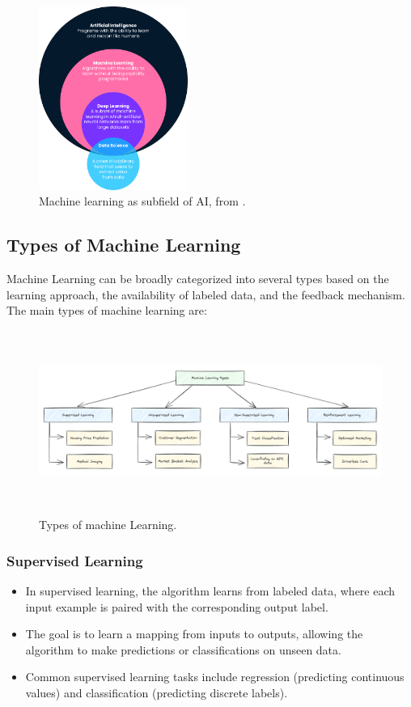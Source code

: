 \begin{figure}[htpb]
    \centering
    \includegraphics[width=\textwidth,height=6cm,keepaspectratio=true]{ml.png}
    \caption{
        Machine learning as subfield of AI, from \cite{datacamp:ml}.
    }
\end{figure}

\subsection{Types of Machine Learning}

Machine Learning can be broadly categorized into several types based on the learning approach, the availability of labeled data, and the feedback mechanism. The main types of machine learning are:

\begin{figure}[htpb]
    \centering
    \includegraphics[width=\textwidth,height=6cm,keepaspectratio=true]{ml-types.png}
    \caption{
        Types of machine Learning.
    }
\end{figure}

\subsubsection*{Supervised Learning}

\begin{itemize}
    \item{In supervised learning, the algorithm learns from labeled data, where each input example is paired with the corresponding output label.}
    \item{The goal is to learn a mapping from inputs to outputs, allowing the algorithm to make predictions or classifications on unseen data.}
    \item{Common supervised learning tasks include regression (predicting continuous values) and classification (predicting discrete labels).}
\end{itemize}

